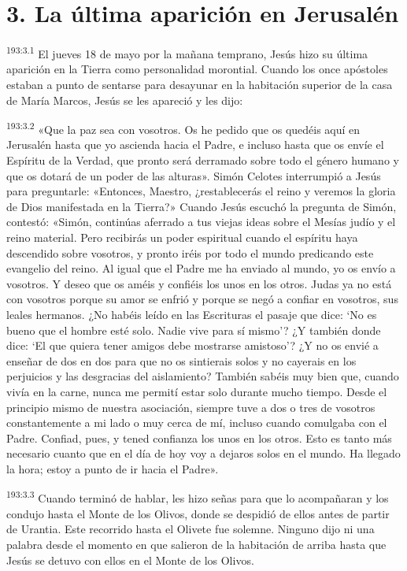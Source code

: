 \section*{3. La última aparición en Jerusalén}
\par 
\textsuperscript{193:3.1} El jueves 18 de mayo por la mañana temprano, Jesús hizo su última aparición en la Tierra como personalidad morontial. Cuando los once apóstoles estaban a punto de sentarse para desayunar en la habitación superior de la casa de María Marcos, Jesús se les apareció y les dijo:

\par 
\textsuperscript{193:3.2} «Que la paz sea con vosotros. Os he pedido que os quedéis aquí en Jerusalén hasta que yo ascienda hacia el Padre, e incluso hasta que os envíe el Espíritu de la Verdad, que pronto será derramado sobre todo el género humano y que os dotará de un poder de las alturas». Simón Celotes interrumpió a Jesús para preguntarle: «Entonces, Maestro, ¿restablecerás el reino y veremos la gloria de Dios manifestada en la Tierra?» Cuando Jesús escuchó la pregunta de Simón, contestó: «Simón, continúas aferrado a tus viejas ideas sobre el Mesías judío y el reino material. Pero recibirás un poder espiritual cuando el espíritu haya descendido sobre vosotros, y pronto iréis por todo el mundo predicando este evangelio del reino. Al igual que el Padre me ha enviado al mundo, yo os envío a vosotros. Y deseo que os améis y confiéis los unos en los otros. Judas ya no está con vosotros porque su amor se enfrió y porque se negó a confiar en vosotros, sus leales hermanos. ¿No habéis leído en las Escrituras el pasaje que dice: `No es bueno que el hombre esté solo. Nadie vive para sí mismo'? ¿Y también donde dice: `El que quiera tener amigos debe mostrarse amistoso'? ¿Y no os envié a enseñar de dos en dos para que no os sintierais solos y no cayerais en los perjuicios y las desgracias del aislamiento? También sabéis muy bien que, cuando vivía en la carne, nunca me permití estar solo durante mucho tiempo. Desde el principio mismo de nuestra asociación, siempre tuve a dos o tres de vosotros constantemente a mi lado o muy cerca de mí, incluso cuando comulgaba con el Padre. Confiad, pues, y tened confianza los unos en los otros. Esto es tanto más necesario cuanto que en el día de hoy voy a dejaros solos en el mundo. Ha llegado la hora; estoy a punto de ir hacia el Padre».

\par 
\textsuperscript{193:3.3} Cuando terminó de hablar, les hizo señas para que lo acompañaran y los condujo hasta el Monte de los Olivos, donde se despidió de ellos antes de partir de Urantia. Este recorrido hasta el Olivete fue solemne. Ninguno dijo ni una palabra desde el momento en que salieron de la habitación de arriba hasta que Jesús se detuvo con ellos en el Monte de los Olivos.


